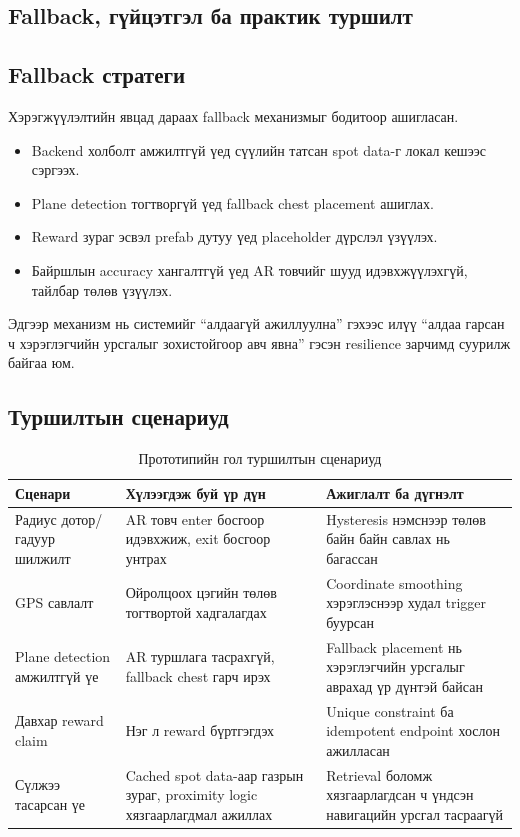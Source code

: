 \begin{sloppy}
\section{Fallback, гүйцэтгэл ба практик туршилт}

\subsection{Fallback стратеги}

Хэрэгжүүлэлтийн явцад дараах fallback механизмыг бодитоор ашигласан.

\begin{itemize}
    \item Backend холболт амжилтгүй үед сүүлийн татсан spot data-г локал кешээс сэргээх.
    \item Plane detection тогтворгүй үед fallback chest placement ашиглах.
    \item Reward зураг эсвэл prefab дутуу үед placeholder дүрслэл үзүүлэх.
    \item Байршлын accuracy хангалтгүй үед AR товчийг шууд идэвхжүүлэхгүй, тайлбар төлөв үзүүлэх.
\end{itemize}

Эдгээр механизм нь системийг ``алдаагүй ажиллуулна'' гэхээс илүү ``алдаа гарсан ч хэрэглэгчийн урсгалыг зохистойгоор авч явна'' гэсэн resilience зарчимд суурилж байгаа юм.

\subsection{Туршилтын сценариуд}

\begin{table}[H]
\centering
\caption{Прототипийн гол туршилтын сценариуд}
\begin{tabular}{|p{4cm}|p{4cm}|p{5cm}|}
\hline
\textbf{Сценари} & \textbf{Хүлээгдэж буй үр дүн} & \textbf{Ажиглалт ба дүгнэлт} \\ \hline
Радиус дотор/гадуур шилжилт & AR товч enter босгоор идэвхжиж, exit босгоор унтрах & Hysteresis нэмснээр төлөв байн байн савлах нь багассан \\ \hline
GPS савлалт & Ойролцоох цэгийн төлөв тогтвортой хадгалагдах & Coordinate smoothing хэрэглэснээр худал trigger буурсан \\ \hline
Plane detection амжилтгүй үе & AR туршлага тасрахгүй, fallback chest гарч ирэх & Fallback placement нь хэрэглэгчийн урсгалыг аврахад үр дүнтэй байсан \\ \hline
Давхар reward claim & Нэг л reward бүртгэгдэх & Unique constraint ба idempotent endpoint хослон ажилласан \\ \hline
Сүлжээ тасарсан үе & Cached spot data-аар газрын зураг, proximity logic хязгаарлагдмал ажиллах & Retrieval боломж хязгаарлагдсан ч үндсэн навигацийн урсгал тасраагүй \\ \hline
\end{tabular}
\end{table}


\end{sloppy}
